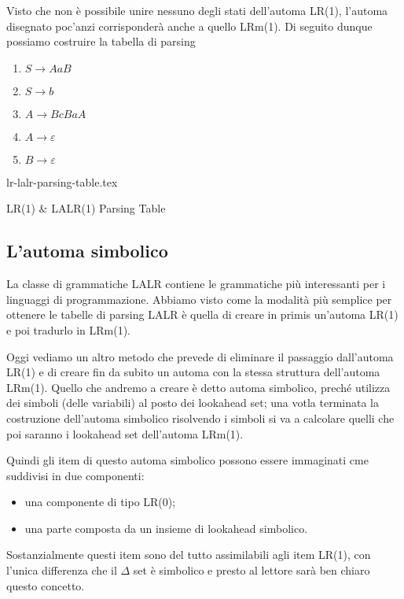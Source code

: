 \documentclass[class=book, crop=false, oneside, 12pt]{standalone}
\begin{document}
Visto che non è possibile unire nessuno degli stati dell'automa LR(1), l'automa disegnato poc'anzi corrisponderà anche a quello LRm(1). Di seguito dunque possiamo costruire la tabella di parsing

\begin{enumerate}
    \item \(S \to AaB\) 
    \item \(S \to b\) 
    \item \(A \to BcBaA\) 
    \item \(A \to \varepsilon\) 
    \item \(B \to \varepsilon\)
\end{enumerate}

\begin{table}[H]
    \centering
    {lr-lalr-parsing-table.tex}
    \caption{LR(1) \& LALR(1) Parsing Table}
    \label{tab:lr-lalr-parsing-table}
\end{table}


\subsection{L'automa simbolico}
La classe di grammatiche LALR contiene le grammatiche più interessanti per i linguaggi di programmazione.
Abbiamo visto come la modalità più semplice per ottenere le tabelle di parsing LALR è quella di creare in primis un'automa LR(1) e poi tradurlo in LRm(1).

Oggi vediamo un altro metodo che prevede di eliminare il passaggio dall'automa LR(1) e di creare fin da subito un automa con la stessa struttura dell'automa LRm(1).
Quello che andremo a creare è detto automa simbolico, preché utilizza dei simboli (delle variabili) al posto dei lookahead set; una votla terminata la costruzione dell'automa simbolico risolvendo i simboli si va a calcolare quelli che poi saranno i lookahead set dell'automa LRm(1).

Quindi gli item di questo automa simbolico possono essere immaginati cme suddivisi in due componenti:
\begin{itemize}
    \item una componente di tipo LR(0);
    \item una parte composta da un insieme di lookahead simbolico.
\end{itemize}
Sostanzialmente questi item sono del tutto assimilabili agli item LR(1), con l'unica differenza che il \(\Delta\) set è simbolico e presto al lettore sarà ben chiaro questo concetto.
\end{document}
